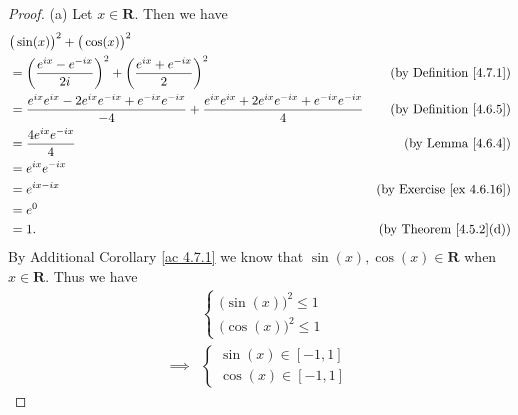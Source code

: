 \begin{proof}{(a)}
    Let \(x \in \mathbf{R}\).
    Then we have
    \begin{align*}
         & \big(\sin(x)\big)^2 + \big(\cos(x)\big)^2                                                                                                                                               \\
         & = \bigg(\frac{e^{i x} - e^{- i x}}{2i}\bigg)^2 + \bigg(\frac{e^{i x} + e^{- i x}}{2}\bigg)^2                                                     & \text{(by Definition \ref{4.7.1})}   \\
         & = \frac{e^{i x} e^{i x} - 2 e^{i x} e^{- i x} + e^{- i x} e^{- i x}}{-4} + \frac{e^{i x} e^{i x} + 2 e^{i x} e^{- i x} + e^{- i x} e^{- i x}}{4} & \text{(by Definition \ref{4.6.5})}   \\
         & = \frac{4 e^{i x} e^{- i x}}{4}                                                                                                                  & \text{(by Lemma \ref{4.6.4})}        \\
         & = e^{i x} e^{- i x}                                                                                                                                                                     \\
         & = e^{i x - i x}                                                                                                                                  & \text{(by Exercise \ref{ex 4.6.16})} \\
         & = e^0                                                                                                                                                                                   \\
         & = 1.                                                                                                                                             & \text{(by Theorem \ref{4.5.2}(d))}
    \end{align*}
    By Additional Corollary \ref{ac 4.7.1} we know that \(\sin(x), \cos(x) \in \mathbf{R}\) when \(x \in \mathbf{R}\).
    Thus we have
    \begin{align*}
                 & \begin{cases}
                       \big(\sin(x)\big)^2 \leq 1 \\
                       \big(\cos(x)\big)^2 \leq 1
                   \end{cases} \\
        \implies & \begin{cases}
                       \sin(x) \in [-1, 1] \\
                       \cos(x) \in [-1, 1]
                   \end{cases}
    \end{align*}
\end{proof}


